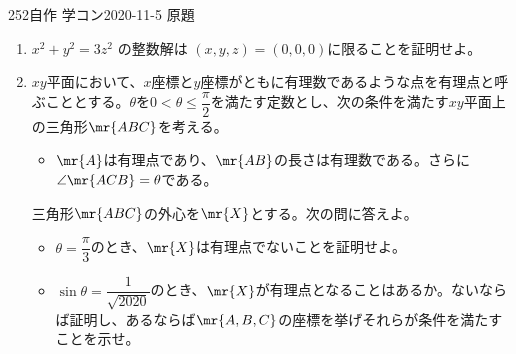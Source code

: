\begin{prob}{252}{\maru}{自作 学コン2020-11-5 原題}
 \begin{enumerate}
  \item $x^2+y^2=3z^2$ の整数解は $(x,y,z)=(0,0,0)$に限ることを証明せよ。
  \item $xy$平面において、$x$座標と$y$座標がともに有理数であるような点を有理点と呼ぶこととする。$\theta$を$0<\theta\le\dfrac{\pi}{2}$を満たす定数とし、次の条件を満たす$xy$平面上の三角形$\mr{ABC}$を考える。
  \begin{itemize}
   \item[(条件)] $\mr{A}$は有理点であり、$\mr{AB}$の長さは有理数である。さらに$\angle\mr{ACB}=\theta$である。
  \end{itemize}
  三角形$\mr{ABC}$の外心を$\mr{X}$とする。次の問に答えよ。
  \begin{itemize}
   \item[(a)] $\theta=\dfrac{\pi}{3}$のとき、$\mr{X}$は有理点でないことを証明せよ。
   \item[(b)] $\sin\theta=\dfrac{1}{\sqrt{2020}}$のとき、$\mr{X}$が有理点となることはあるか。ないならば証明し、あるならば$\mr{A,B,C}$の座標を挙げそれらが条件を満たすことを示せ。 
  \end{itemize}
 \end{enumerate}
\end{prob}